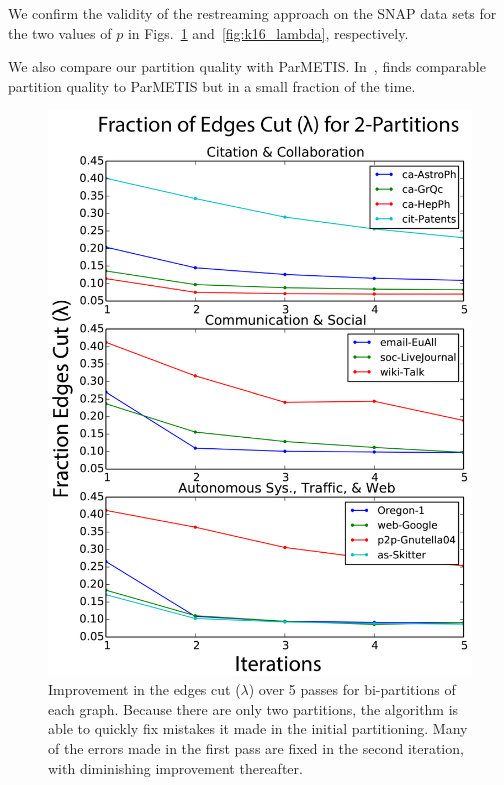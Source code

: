 We confirm the validity of the restreaming approach on the SNAP data sets for the two values of $p$ in Figs.~\ref{fig:k2_lambda} and~\ref{fig:k16_lambda}, respectively. 

We also compare our partition quality with ParMETIS.
In~, \ourmethod finds comparable partition quality to ParMETIS but in a small fraction of the time. 

\begin{figure}[t!]
\centering
\includegraphics[width=0.9\columnwidth] {figures/real_k2_lambda.pdf}
\caption[Caption for]{Improvement in the edges cut ($\lambda$) over 5 passes for bi-partitions of each graph. Because there are only two partitions, the algorithm is able to quickly fix mistakes it made in the initial partitioning. Many of the errors made in the first pass are fixed in the second iteration, with diminishing improvement thereafter.}
\label{fig:k2_lambda}
\end{figure}

